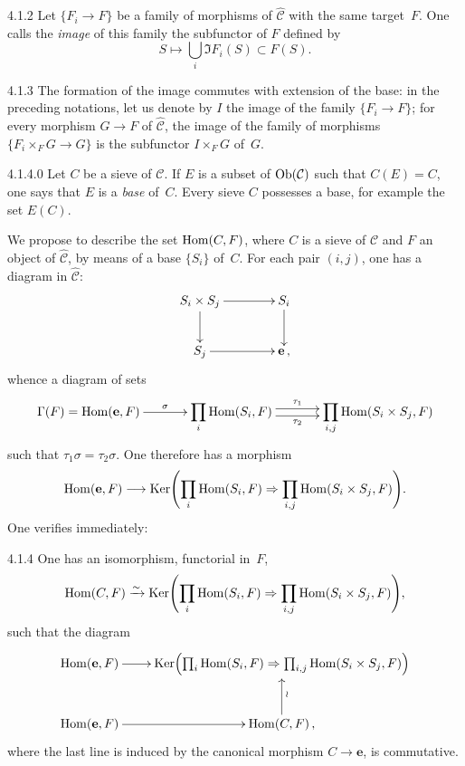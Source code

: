 \begin{definition}{4.1.2}
\label{IV.4.1.2}
Let \(\{F_{i}\to F\}\) be a family of morphisms of
\(\widehat{\mathcal{C}}\) with the same target~\(F\). One calls the
\emph{image} of this family the subfunctor of \(F\) defined by
\[
S\longmapsto\bigcup_{i}\Im F_{i}(S)\subset F(S).
\]
\end{definition}

\begin{proposition}{4.1.3}
\label{IV.4.1.3}
The formation of the image commutes with extension of the base: in the
preceding notations, let us denote by \(I\) the image of the family
\(\{F_{i}\to F\}\); for every morphism \(G\to F\) of
\(\widehat{\mathcal{C}}\), the image of the family of morphisms
\(\{F_{i}\times_{F}G\to G\}\) is the subfunctor \(I\times_{F}G\) of~\(G\).
\end{proposition}

\begin{definition}{4.1.4.0}
\label{IV.4.1.4.0}
{\renewcommand{\thefootnote}{(19)}}%
Let \(C\) be a sieve of \(\mathcal{C}\). If \(E\) is a subset of
\(\operatorname{Ob}(\mathcal{C})\) such that \(C(E)=C\), one says that \(E\) is a
\emph{base} of~\(C\). Every sieve \(C\) possesses a base, for example the
set \(E(C)\).
\end{definition}

We propose to describe the set \(\operatorname{Hom}(C,F)\), where \(C\) is a sieve of
\(\mathcal{C}\) and \(F\) an object of \(\widehat{\mathcal{C}}\), by means
of a base \(\{S_{i}\}\) of~\(C\). For each pair \((i,j)\), one has a
diagram in \(\widehat{\mathcal{C}}\):
\[
\xymatrix@C=4em@R=2.4em{
S_{i}\times S_{j} \ar[r] \ar[d] & S_{i} \ar[d] \\
S_{j} \ar[r] & \mathbf{e}\,,
}
\]
whence a diagram of sets
\[
\xymatrix@C=3.4em{
\Gamma(F)=\Hom(\mathbf{e},F) \ar[r]^-{\sigma}
  & \displaystyle\prod_{i}\Hom(S_{i},F)
      \ar@<0.65ex>[r]^-{\tau_{1}}
      \ar@<-0.65ex>[r]_-{\tau_{2}}
  & \displaystyle\prod_{i,j}\Hom(S_{i}\times S_{j},F)
}
\]
such that \(\tau_{1}\sigma=\tau_{2}\sigma\). One therefore has a morphism
\[
\operatorname{Hom}(\mathbf{e},F)\longrightarrow
\operatorname{Ker}\Biggl(\prod_{i}\operatorname{Hom}(S_{i},F)
  \Rightarrow
  \prod_{i,j}\operatorname{Hom}(S_{i}\times S_{j},F)\Biggr).
\]
One verifies immediately:

\begin{proposition}{4.1.4}
\label{IV.4.1.4}
One has an isomorphism, functorial in~\(F\),
\[
\operatorname{Hom}(C,F)\xrightarrow{\sim}
\operatorname{Ker}\Biggl(\prod_{i}\operatorname{Hom}(S_{i},F)
  \Rightarrow
  \prod_{i,j}\operatorname{Hom}(S_{i}\times S_{j},F)\Biggr),
\]
such that the diagram
\[
\xymatrix@C=2.2em@R=2.8em{
\Hom(\mathbf{e},F) \ar[r]
  & \Ker\Bigl(\prod_{i}\Hom(S_{i},F)
      \Rightarrow
      \prod_{i,j}\Hom(S_{i}\times S_{j},F)\Bigr)
\\
\Hom(\mathbf{e},F) \ar[r]
  & \Hom(C,F) \ar[u]_{\wr}
\,,}
\]
where the last line is induced by the canonical morphism
\(C\to\mathbf{e}\), is commutative.
\end{proposition}

